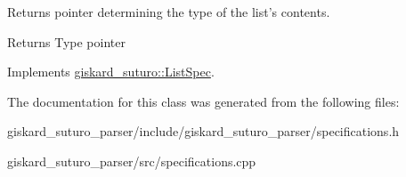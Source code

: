 Returns pointer determining the type of the list's contents. 

\begin{DoxyReturn}{Returns}
Type pointer 
\end{DoxyReturn}


Implements \hyperlink{classgiskard__suturo_1_1ListSpec_aba0a625da0d48e702aa723fb6fb3bc7e}{giskard\-\_\-suturo\-::\-List\-Spec}.



The documentation for this class was generated from the following files\-:\begin{DoxyCompactItemize}
\item 
giskard\-\_\-suturo\-\_\-parser/include/giskard\-\_\-suturo\-\_\-parser/specifications.\-h\item 
giskard\-\_\-suturo\-\_\-parser/src/specifications.\-cpp\end{DoxyCompactItemize}
